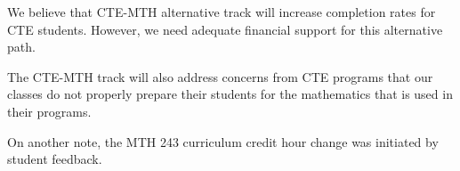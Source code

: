 We believe that CTE-MTH alternative track will increase completion rates for
CTE students. However, we need adequate financial support for this alternative
path.

The CTE-MTH track will also address concerns from CTE programs that our classes
do not properly prepare their students for the mathematics that is used in
their programs.

On another note, the MTH 243 curriculum credit hour change was initiated by
student feedback.
